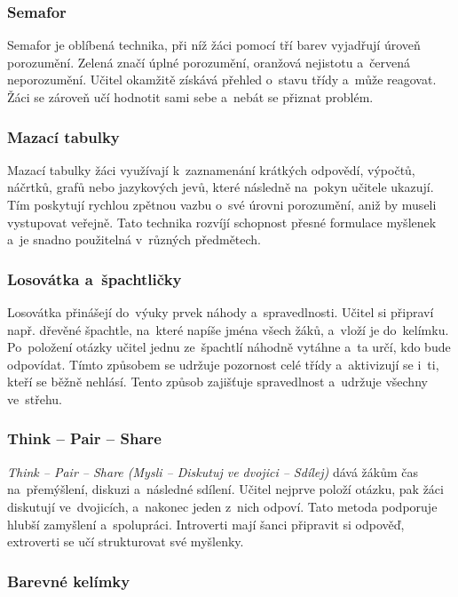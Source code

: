 \documentclass[male,czech,api_bc]{kitheses}
\begin{document}
\subsubsection{Semafor}

Semafor je oblíbená technika, při níž žáci pomocí tří barev vyjadřují úroveň porozumění. Zelená značí úplné porozumění, oranžová nejistotu a~červená neporozumění. Učitel okamžitě získává přehled o~stavu třídy a~může reagovat. Žáci se zároveň učí hodnotit sami sebe a~nebát se přiznat problém.

\subsubsection{Mazací tabulky}

Mazací tabulky žáci využívají k~zaznamenání krátkých odpovědí, výpočtů, náčrtků, grafů nebo jazykových jevů, které následně na~pokyn učitele ukazují. Tím poskytují rychlou zpětnou vazbu o~své úrovni porozumění, aniž by museli vystupovat veřejně. Tato technika rozvíjí schopnost přesné formulace myšlenek a~je snadno použitelná v~různých předmětech.

\subsubsection{Losovátka a~špachtličky}

Losovátka přinášejí do~výuky prvek náhody a~spravedlnosti. Učitel si připraví např. dřevěné špachtle, na~které napíše jména všech žáků, a~vloží je do~kelímku. Po~položení otázky učitel jednu ze~špachtlí náhodně vytáhne a~ta určí, kdo bude odpovídat. Tímto způsobem se udržuje pozornost celé třídy a~aktivizují se i~ti, kteří se běžně nehlásí. Tento způsob zajišťuje spravedlnost a~udržuje všechny ve~střehu.

\subsubsection{Think -- Pair -- Share}

\textit{Think -- Pair -- Share (Mysli -- Diskutuj ve dvojici -- Sdílej)} dává žákům čas na~přemýšlení, diskuzi a~následné sdílení. Učitel nejprve položí otázku, pak žáci diskutují ve~dvojicích, a~nakonec jeden z~nich odpoví. Tato metoda podporuje hlubší zamyšlení a~spolupráci. Introverti mají šanci připravit si odpověď, extroverti se učí strukturovat své myšlenky.

\subsubsection{Barevné kelímky}
\end{document}
